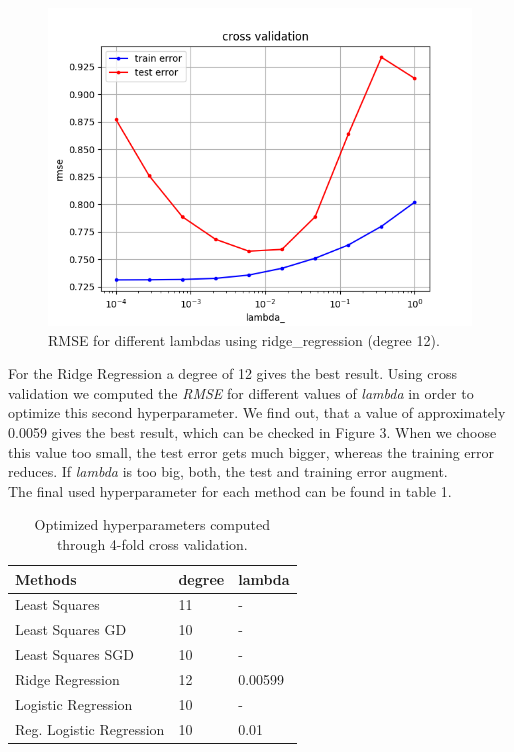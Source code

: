 \documentclass[10pt,conference,compsocconf]{IEEEtran}
\begin{document}
\begin{figure}[htbp]
	\centering
	\includegraphics[width=\columnwidth]{cross_validation_ridge_degree_12.png}
	\caption{RMSE for different lambdas using ridge\_regression (degree 12).}
	\vspace{-3mm}
	\label{fig:crossvalidationridge}
\end{figure}
 For the Ridge Regression a degree of 12 gives the best result. Using cross validation we computed the \textit{RMSE} for different values of \textit{lambda} in order to optimize this second hyperparameter. We find out, that a value of approximately 0.0059 gives the best result, which can be checked in Figure 3. When we choose this value too small, the test error gets much bigger, whereas the training error reduces. If \textit{lambda} is too big, both, the test and training error augment.\\
 The final used hyperparameter for each method can be found in table 1.\\


\begin{table}[htbp]
	\centering
	\begin{tabular}[c]{|l||l|l|}
		\hline
		Methods&degree&lambda\\
		\hline
		Least Squares& 11 &-\\
		Least Squares GD& 10 & -\\
		Least Squares SGD & 10 &-\\		Ridge Regression&12&0.00599\\
		Logistic Regression & 10&-\\
		Reg. Logistic Regression&10&0.01\\
		\hline
	\end{tabular}
	\caption{Optimized hyperparameters computed\\ through 4-fold cross validation.}
	\label{tab:hyperpam}
\end{table}
\end{document}
